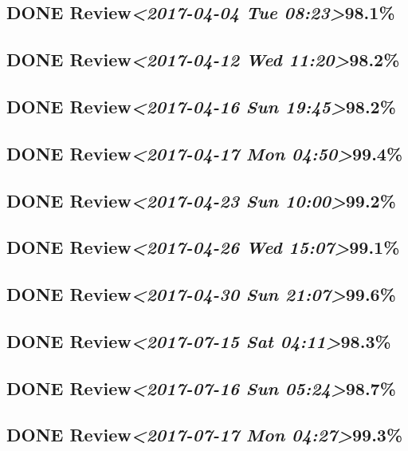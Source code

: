 \documentclass[11pt]{ctexart}
\begin{document}
\subsection{{\bfseries\sffamily DONE} Review\textit{<2017-04-04 Tue 08:23>}98.1\%}
\label{sec:orgb1bb27b}
\subsection{{\bfseries\sffamily DONE} Review\textit{<2017-04-12 Wed 11:20>}98.2\%}
\label{sec:org471957e}
\subsection{{\bfseries\sffamily DONE} Review\textit{<2017-04-16 Sun 19:45>}98.2\%}
\label{sec:orgda58c0b}
\subsection{{\bfseries\sffamily DONE} Review\textit{<2017-04-17 Mon 04:50>}99.4\%}
\label{sec:orgdde0626}
\subsection{{\bfseries\sffamily DONE} Review\textit{<2017-04-23 Sun 10:00>}99.2\%}
\label{sec:org824c8d7}
\subsection{{\bfseries\sffamily DONE} Review\textit{<2017-04-26 Wed 15:07>}99.1\%}
\label{sec:org504c0b4}
\subsection{{\bfseries\sffamily DONE} Review\textit{<2017-04-30 Sun 21:07>}99.6\%}
\label{sec:orgc5129e1}
\subsection{{\bfseries\sffamily DONE} Review\textit{<2017-07-15 Sat 04:11>}98.3\%}
\label{sec:orgfd21d0f}
\subsection{{\bfseries\sffamily DONE} Review\textit{<2017-07-16 Sun 05:24>}98.7\%}
\label{sec:org9f4f005}
\subsection{{\bfseries\sffamily DONE} Review\textit{<2017-07-17 Mon 04:27>}99.3\%}
\label{sec:org5c6f407}
\end{document}
